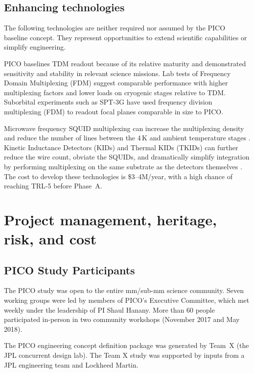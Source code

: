 \subsection{Enhancing technologies}
\label{sec:enhancing_technologies} %

The following technologies are neither required nor assumed by the
PICO baseline concept. They represent opportunities to extend
scientific capabilities or simplify engineering.

PICO baselines TDM readout because of its relative maturity and
demonstrated sensitivity and stability in relevant science
missions. Lab tests of Frequency Domain Multiplexing (FDM) suggest
comparable performance with higher multiplexing factors and lower
loads on cryogenic stages relative to TDM. Suborbital experiments such
as SPT-3G have used frequency division multiplexing (FDM) to readout
focal planes comparable in size to PICO.

Microwave frequency SQUID multiplexing can increase the multiplexing
density and reduce the number of lines between the 4\,K and ambient
temperature stages \citep{Dober2017,Irwin2004}. Kinetic Inductance
Detectors (KIDs) and Thermal KIDs (TKIDs) can further reduce the wire
count, obviate the SQUIDs, and dramatically simplify integration by
performing multiplexing on the same substrate as the detectors
themselves \citep{McCarrick2016,Steinbach2018}. The cost to develop
these technologies is \$3--4M/year, with a high chance of reaching
TRL-5 before Phase~A.

\bigskip
\section{Project management, heritage, risk, and cost}
\label{sec:project_management} %

\subsection{PICO Study Participants}
\label{sec:study_participants} %

The PICO study was open to the entire mm/sub-mm science community. 
Seven working groups were led by
members of PICO's Executive Committee, which met weekly under the
leadership of PI Shaul Hanany. More than 60 people participated
in-person in two community workshops (November 2017 and May 2018).

The PICO engineering concept definition package was generated by
Team~X (the JPL concurrent design lab). The Team X study was supported
by inputs from a JPL engineering team and Lockheed Martin.

